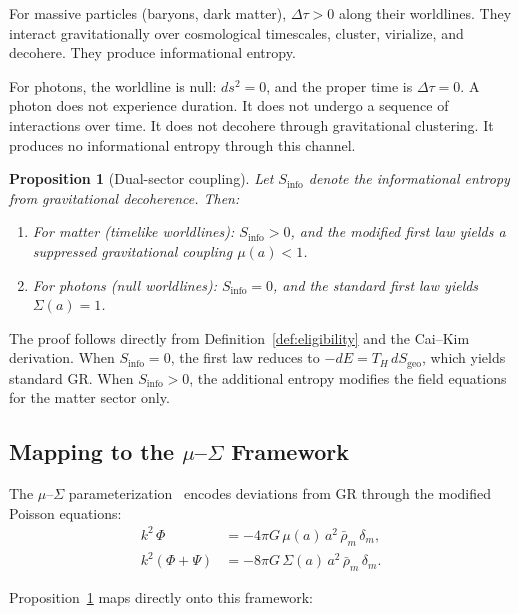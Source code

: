\documentclass[11pt]{article}
\newtheorem{proposition}{Proposition}
\begin{document}
For massive particles (baryons, dark matter), $\Delta\tau > 0$ along their
worldlines.  They interact gravitationally over cosmological timescales,
cluster, virialize, and decohere.  They produce informational entropy.

For photons, the worldline is null: $ds^2 = 0$, and the proper time is
$\Delta\tau = 0$.  A photon does not experience duration.  It does not undergo
a sequence of interactions over time.  It does not decohere through
gravitational clustering.  It produces no informational entropy through
this channel.

\begin{proposition}[Dual-sector coupling]
\label{prop:dual_sector}
Let $S_\mathrm{info}$ denote the informational entropy from gravitational
decoherence.  Then:
\begin{enumerate}
\item For matter (timelike worldlines): $S_\mathrm{info} > 0$, and the
  modified first law yields a suppressed gravitational coupling $\mu(a) < 1$.
\item For photons (null worldlines): $S_\mathrm{info} = 0$, and the standard
  first law yields $\Sigma(a) = 1$.
\end{enumerate}
\end{proposition}

The proof follows directly from Definition~\ref{def:eligibility} and the
Cai--Kim derivation.  When $S_\mathrm{info} = 0$, the first law reduces to
$-dE = T_H\,dS_\mathrm{geo}$, which yields standard GR.  When
$S_\mathrm{info} > 0$, the additional entropy modifies the field equations
for the matter sector only.

\subsection{Mapping to the $\mu$--$\Sigma$ Framework}

The $\mu$--$\Sigma$ parameterization~\citep{PogosianSilvestri2016} encodes
deviations from GR through the modified Poisson equations:
\begin{align}
k^2\,\Phi &= -4\pi G\,\mu(a)\,a^2\,\bar{\rho}_m\,\delta_m,
  \label{eq:poisson_mu}\\
k^2(\Phi + \Psi) &= -8\pi G\,\Sigma(a)\,a^2\,\bar{\rho}_m\,\delta_m.
  \label{eq:poisson_sigma}
\end{align}

Proposition~\ref{prop:dual_sector} maps directly onto this framework:
\end{document}
